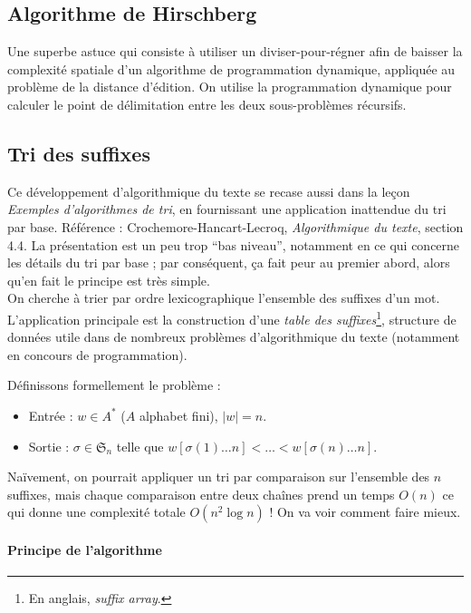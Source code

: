 \documentclass[a4paper, 11pt]{article}
\def\Sigmap{\mathfrak{S}}
\begin{document}
\subsection{Algorithme de Hirschberg}

Une superbe astuce qui consiste à utiliser un diviser-pour-régner afin de
baisser la complexité spatiale d'un algorithme de programmation dynamique,
appliquée au problème de la distance d'édition. On utilise la programmation
dynamique pour calculer le point de délimitation entre les deux sous-problèmes
récursifs.


\newpage

\subsection{Tri des suffixes}

Ce développement d'algorithmique du texte se recase aussi dans la leçon
\emph{Exemples d'algorithmes de tri}, en fournissant une application inattendue
du tri par base. Référence : Crochemore-Hancart-Lecroq, \emph{Algorithmique du
  texte}, section 4.4. La présentation est un peu trop \enquote{bas niveau},
notamment en ce qui concerne les détails du tri par base ; par conséquent, ça
fait peur au premier abord, alors qu'en fait le principe est très simple.\\

On cherche à trier par ordre lexicographique l'ensemble des suffixes d'un mot.
L'application principale est la construction d'une \emph{table des
  suffixes}\footnote{En anglais, \emph{suffix array}.}, structure de données
utile dans de nombreux problèmes d'algorithmique du texte (notamment en concours
de programmation).

Définissons formellement le problème :
\begin{itemize}
\item Entrée : $w \in A^*$ ($A$ alphabet fini), $|w| = n$.
\item Sortie : $\sigma \in \Sigmap_n$ telle que $w[\sigma(1) \ldots n] < \ldots
  < w[\sigma(n) \ldots n]$.
\end{itemize}

Naïvement, on pourrait appliquer un tri par comparaison sur l'ensemble des $n$
suffixes, mais chaque comparaison entre deux chaînes prend un temps $O(n)$ ce
qui donne une complexité totale $O(n^2 \log n)$ ! On va voir comment faire
mieux.

\paragraph{Principe de l'algorithme}
\end{document}

